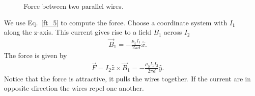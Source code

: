 \documentclass[12pt,a4paper,oneside]{book}
\begin{document}
\begin{onehalfspace}
\begin{example}
\begin{figure}[H]
		\captionsetup{width=0.75\textwidth}		
		\caption{Force between two parallel wires.}
		\label{example_327_1}
	\end{figure}
We use Eq.~\eqref{ft_5} to compute the force. Choose a coordinate system with $I_1$ along the z-axis. This current gives rise to a field $B_1$ across $I_2$
\begin{equation*}\label{}
	\begin{aligned}
		\vec{B}_1=-\frac{\mu_0I_1}{2\pi d}\hat{x}.
	\end{aligned}
\end{equation*}
The force is given by
\begin{equation}\label{example_327_2}
	\begin{aligned}
		\vec{F}=I_2\hat{z}\times\vec{B}_1 =  -\frac{\mu_0I_1I_2}{2\pi d}\hat{y}.
	\end{aligned}
\end{equation}
Notice that the force is attractive, it pulls the wires together. If the current are in opposite direction the wires repel one another. 
\end{example}

\end{onehalfspace}
\end{document}

